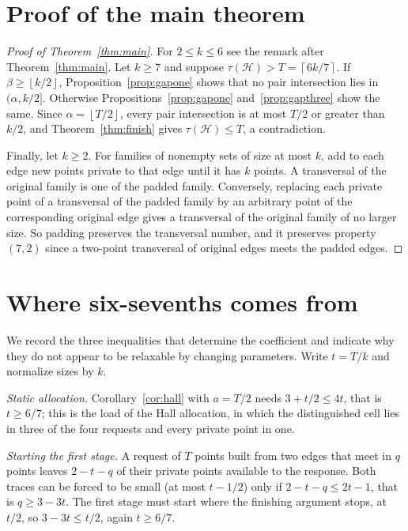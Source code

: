 \documentclass[11pt]{article}
\numberwithin{equation}{section}
\theoremstyle{definition}
\theoremstyle{remark}
\newcommand{\HH}{\mathcal H}
\newcommand{\ceil}[1]{\left\lceil #1\right\rceil}
\newcommand{\floor}[1]{\left\lfloor #1\right\rfloor}
\begin{document}
\section{Proof of the main theorem}\label{sec:proofmain}

\begin{proof}[Proof of Theorem~\ref{thm:main}]
For $2\le k\le6$ see the remark after Theorem~\ref{thm:main}. Let $k\ge7$
and suppose $\tau(\HH)>T=\ceil{6k/7}$. If $\beta\ge\floor{k/2}$,
Proposition~\ref{prop:gapone} shows that no pair intersection lies in
$(\alpha,k/2]$. Otherwise Propositions~\ref{prop:gapone}
and~\ref{prop:gapthree} show the same. Since $\alpha=\floor{T/2}$, every
pair intersection is at most $T/2$ or greater than $k/2$, and
Theorem~\ref{thm:finish} gives $\tau(\HH)\le T$, a contradiction.

Finally, let $k\ge2$. For families of nonempty sets of size at most $k$, add to each edge new
points private to that edge until it has $k$ points. A transversal of
the original family is one of the padded family. Conversely, replacing
each private point of a transversal of the padded family by an arbitrary
point of the corresponding original edge gives a transversal of the
original family of no larger size. So padding preserves the transversal
number, and it preserves property $(7,2)$ since a two-point transversal
of original edges meets the padded edges.
\end{proof}

\section{Where six-sevenths comes from}\label{sec:limits}

We record the three inequalities that determine the coefficient and
indicate why they do not appear to be relaxable by changing parameters.
Write $t=T/k$ and normalize sizes by $k$.

\emph{Static allocation.} Corollary~\ref{cor:hall} with $a=T/2$ needs
$3+t/2\le4t$, that is $t\ge6/7$; this is the load of the Hall
allocation, in which the distinguished cell lies in three of the four
requests and every private point in one.

\emph{Starting the first stage.} A request of $T$ points built from two
edges that meet in $q$ points leaves $2-t-q$ of their private points
available to the response. Both traces can be forced to be small (at
most $t-1/2$) only if $2-t-q\le2t-1$, that is $q\ge3-3t$. The first stage
must start where the finishing argument stops, at $t/2$, so
$3-3t\le t/2$, again $t\ge6/7$.
\end{document}
